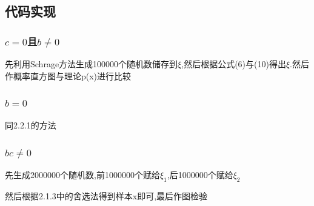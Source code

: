 \documentclass[UTF8]{ctexart}
\begin{document}
\subsection{代码实现}
\subsubsection{$c=0$且$b\neq 0$}
先利用Schrage方法生成100000个随机数储存到$\xi$,然后根据公式(6)与(10)得出$\xi$.然后作概率直方图与理论p(x)进行比较

\subsubsection{$b=0$}
同2.2.1的方法

\subsubsection{$bc\neq 0$}
先生成2000000个随机数,前1000000个赋给$\xi_1$,后1000000个赋给$\xi_2$

然后根据2.1.3中的舍选法得到样本x即可,最后作图检验
\end{document}
